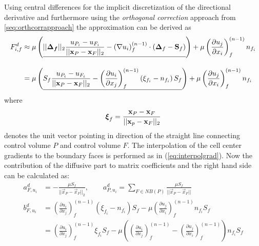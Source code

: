       Using central differences for the implicit discretization of the directional derivative and furthermore using the \textit{orthogonal correction} approach from \ref{seq:orthcorrapproach} the approximation can be derived as
      \begin{align*}
        F_{i,f}^d 
        &\approx 
        \mu \left( \underline{||\boldsymbol{\boldsymbol{\Delta}_f}||_2 \frac{u_{P_i} - u_{F_i}}{ || \mathbf{x}_P - \mathbf{x}_F ||_2 }  
        -  \left(\nabla u_i \right)_f^{(n-1)} \cdot \left(\boldsymbol{\Delta}_f - \mathbf{S}_f\right)  }  \right)
        + \mu \left( \frac{\partial u_j}{\partial x_i} \right)_f^{(n-1)} n_{f_i} \\[1em]
        &= \mu \left(\underline{  S_f \frac{u_{P_i} - u_{F_i}}{ || \mathbf{x}_P - \mathbf{x}_F ||_2 }  
    - \left( \frac{\partial u_i}{\partial x_j}\right)_f^{(n-1)} \left(\xi_{f_i} - n_{f_i}\right)S_f  } \right)
      + \mu \left( \frac{\partial u_j}{\partial x_i} \right)_f^{(n-1)} n_{f_i}
    \end{align*}
      where
      \begin{displaymath}
        \boldsymbol{\xi}_f = \frac{\mathbf{x}_P - \mathbf{x}_F}{|| \mathbf{x}_p - \mathbf{x}_F ||_2}
      \end{displaymath}
      denotes the unit vector pointing in direction of the straight line connecting control volume \(P\) and control volume \(F\). The interpolation of the cell center gradients to the boundary faces is performed as in (\ref{eq:interpolgrad}). Now the contribution of the diffusive part to matrix coefficients and the right hand side can be calculated as:
      \begin{subequations}
        \begin{align}
          a_{F,u_i}^d &= - \frac{\mu S_f}{||\vec{x}_P - \vec{x}_F||_2}, 
          \quad \quad a_{P,u_i}^d = \sum_{F \in NB(P)} \frac{\mu S_f}{|| \vec{x}_P - \vec{x}_F ||} \\[1em]
          b_{F,u_i}^d &=   \left( \frac{\partial u_i}{\partial x_j}\right)_f^{(n-1)} \left(\xi_{f_i} - n_{f_i}\right)S_f  
          - \mu \left( \frac{\partial u_j}{\partial x_i} \right)_f^{(n-1)} n_{f_i} S_f   \nonumber \\[0.5em]
          &=   \left( \frac{\partial u_i}{\partial x_j}\right)_f^{(n-1)} \xi_{f_i} S_f
          - \mu \left( \left( \frac{\partial u_i}{\partial x_j} \right)_f^{(n-1)}
          - \left( \frac{\partial u_j}{\partial x_i} \right)_f^{(n-1)} \right) n_{f_i} S_f 
        \end{align}
      \end{subequations}


